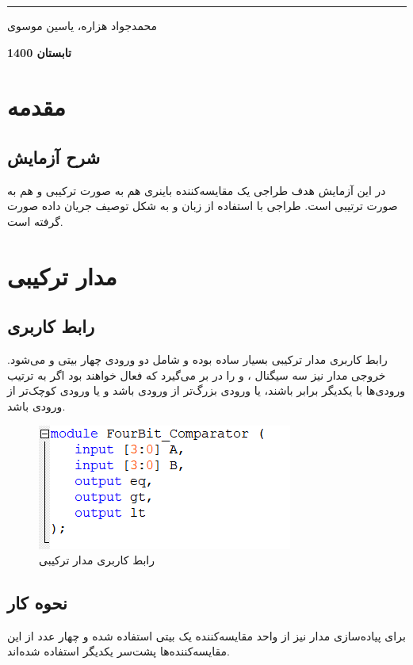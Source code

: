\documentclass[12pt,onecolumn,a4paper,fleqn]{article}
\begin{document}
\begin{titlepage}
\begin{center}
			\noindent\rule[1ex]{\linewidth}{1pt}
			\vspace*{1.5cm}
			\begin{Large}
				محمدجواد هزاره، یاسین موسوی
				
				\vspace*{1.5cm}
				\textbf{
					تابستان 1400
				}
			\end{Large}			
		\end{center}
		\thispagestyle{empty}
	\end{titlepage}	
	\pagebreak
	
	\tableofcontents
	\thispagestyle{empty}
	\pagebreak
	\section{مقدمه}
	\subsection{شرح آزمایش}
	در این آزمایش هدف طراجی یک مقايسه‌کننده باینری هم به صورت ترکیبی و هم به صورت ترتیبی است. طراجی با استفاده از زبان
	 و به شکل توصیف جریان داده صورت گرفته است.
	\pagebreak
	\section{مدار ترکیبی}
	\subsection{رابط‌ کاربری}
	رابط کاربری مدار ترکیبی بسیار ساده بوده و شامل دو ورودی چهار بیتی
	و
	می‌شود. خروجی مدار نیز سه سیگنال 
	،
	و
	را در بر می‌گیرد که فعال خواهند بود اگر به ترتیب ورودی‌ها با یکدیگر برابر باشند، یا ورودی 
	بزرگ‌تر از ورودی 
	باشد و یا ورودی
	کوچک‌تر از ورودی 
	باشد.
	\begin{figure}[H]
		\centering
		\includegraphics[scale=0.95]{source/interface_comb.png}
		\caption{رابط کاربری مدار ترکیبی}
	\end{figure}
	\subsection{نحوه کار}
	برای پیاده‌سازی مدار نیز از واحد مقايسه‌کننده یک بیتی استفاده شده و چهار عدد از این مقايسه‌کننده‌ها پشت‌سر یکدیگر استفاده شده‌اند.
\end{document}
